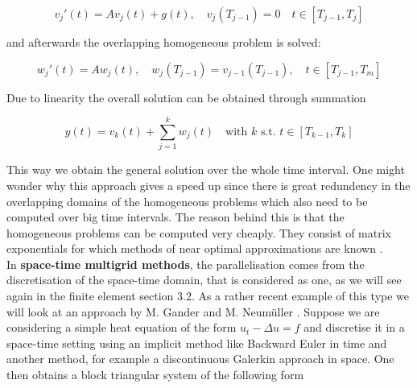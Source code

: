 \documentclass[../draft_1.tex]{subfiles}
\begin{document}
\begin{ceqn}
	\begin{equation}
	v_j'(t) = A v_j(t) + g(t), \quad v_j(T_{j-1}) = 0 \quad t \in [T_{j-1}, T_j]
	\end{equation}
\end{ceqn}
and afterwards the overlapping homogeneous problem is solved:
\begin{ceqn}
	\begin{equation}
	w_j'(t) = A w_j(t), \quad w_j(T_{j-1}) = v_{j-1}(T_{j-1}), \quad t \in [T_{j-1}, T_m]
	\end{equation}
\end{ceqn}
Due to linearity the overall solution can be obtained through summation
\begin{ceqn}
	\begin{equation}
	y(t) = v_k(t) + \sum_{j=1}^{k}w_j(t) \quad \text{with } k \text{ s.t. } t \in [T_{k-1}, T_k]
	\end{equation}
\end{ceqn}
This way we obtain the general solution over the whole time interval. One might wonder why this approach gives a speed up since there is great redundency in the overlapping domains of the homogeneous problems which also need to be computed over big time intervals. The reason behind this is that the homogeneous problems can be computed very cheaply. They consist of matrix exponentials for which methods of near optimal approximations are known \cite{gander2013paraexp}. 
\smallskip
\\
In \textbf{space-time multigrid methods}, the parallelisation comes from the discretisation of the space-time domain, that is considered as one, as we will see again in the finite element section 3.2. As a rather recent example of this type we will look at an approach by M. Gander and M. Neum\"uller \cite{gander2016analysis}. Suppose we are considering a simple heat equation of the form $u_t - \Delta u = f $ and discretise it in a space-time setting using an implicit method like Backward Euler in time and another method, for example a discontinuous Galerkin approach in space. One then obtains a block triangular system of the following form
\end{document}
